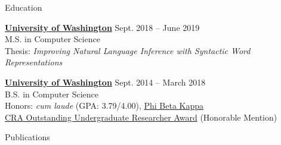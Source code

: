 \documentclass{resume}
\begin{document}
\begin{rSection}{Education}

  {\href{https://www.cs.washington.edu/}
    {\bf University of Washington}} \hfill {Sept. 2018 -- June 2019} \\
  M.S. in Computer Science \\
  Thesis: \emph{Improving Natural Language Inference with Syntactic Word Representations}

  \vspace{-0.2em}
  {\href{https://www.cs.washington.edu/}
        {\bf University of Washington}} \hfill {Sept. 2014 -- March 2018} \\
  B.S. in Computer Science \\
  Honors: \emph{cum laude} (GPA: 3.79/4.00), \href{https://www.pbk.org/web}
    {Phi Beta Kappa} \\
  \href{https://cra.org/about/awards/outstanding-undergraduate-researcher-award/}
       {CRA Outstanding Undergraduate Researcher Award} (Honorable Mention)

\end{rSection}

\begin{rSection}{Publications}
\vspace{1.5em}


\end{rSection}
\end{document}
